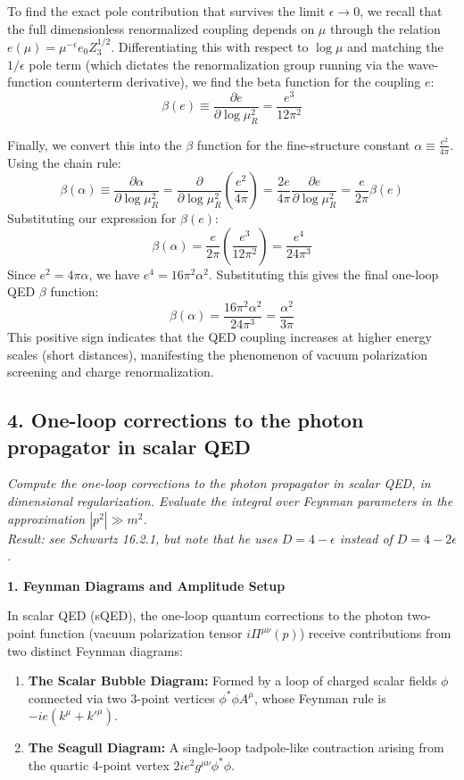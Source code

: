 To find the exact pole contribution that survives the limit $\epsilon \to 0$, we recall that the full dimensionless renormalized coupling depends on $\mu$ through the relation $e(\mu) = \mu^{-\epsilon} e_0 Z_3^{1/2}$. Differentiating this with respect to $\log \mu$ and matching the $1/\epsilon$ pole term (which dictates the renormalization group running via the wave-function counterterm derivative), we find the beta function for the coupling $e$:
\[
    \beta(e) \equiv \frac{\partial e}{\partial \log \mu_R^2} = \frac{e^3}{12\pi^2}
\]

Finally, we convert this into the $\beta$ function for the fine-structure constant $\alpha \equiv \frac{e^2}{4\pi}$. Using the chain rule:
\[
    \beta(\alpha) \equiv \frac{\partial \alpha}{\partial \log \mu_R^2} = \frac{\partial}{\partial \log \mu_R^2} \left( \frac{e^2}{4\pi} \right) = \frac{2e}{4\pi} \frac{\partial e}{\partial \log \mu_R^2} = \frac{e}{2\pi} \beta(e)
\]
Substituting our expression for $\beta(e)$:
\[
    \beta(\alpha) = \frac{e}{2\pi} \left( \frac{e^3}{12\pi^2} \right) = \frac{e^4}{24\pi^3}
\]
Since $e^2 = 4\pi\alpha$, we have $e^4 = 16\pi^2 \alpha^2$. Substituting this gives the final one-loop QED $\beta$ function:
\[
    \beta(\alpha) = \frac{16\pi^2 \alpha^2}{24\pi^3} = \frac{\alpha^2}{3\pi}
\]
This positive sign indicates that the QED coupling increases at higher energy scales (short distances), manifesting the phenomenon of vacuum polarization screening and charge renormalization.


\subsection*{4. One-loop corrections to the photon propagator in scalar QED}

\begin{center}
    \textit{Compute the one-loop corrections to the photon propagator in scalar QED, in dimensional regularization. Evaluate the integral over Feynman parameters in the approximation $|p^2| \gg m^2$. \\
        Result: see Schwartz 16.2.1, but note that he uses $D = 4 - \epsilon$ instead of $D = 4 - 2\epsilon$.}
\end{center}

\textbf{1. Feynman Diagrams and Amplitude Setup}

In scalar QED (sQED), the one-loop quantum corrections to the photon two-point function (vacuum polarization tensor $i\Pi^{\mu\nu}(p)$) receive contributions from two distinct Feynman diagrams:
\begin{enumerate}
    \item \textbf{The Scalar Bubble Diagram:} Formed by a loop of charged scalar fields $\phi$ connected via two 3-point vertices $\phi^*\phi A^\mu$, whose Feynman rule is $-ie(k^\mu + k'^\mu)$.
    \item \textbf{The Seagull Diagram:} A single-loop tadpole-like contraction arising from the quartic 4-point vertex $2ie^2 g^{\mu\nu} \phi^*\phi$.
\end{enumerate}

